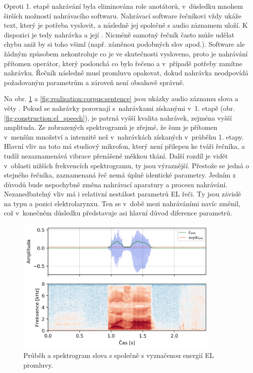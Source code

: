 Oproti 1. etapě nahrávání byla eliminována role anotátorů, v~důsledku mnohem širších možností nahrávacího softwaru.
Nahrávací software řečníkovi vždy ukáže text, který je potřeba vyslovit, a následně jej společně s audio záznamem uloží.
K dispozici je tedy nahrávka a její .
Nicméně samotný řečník často může udělat chybu aniž by si toho všiml (např. záměnou podobných slov apod.).
Software ale žádným způsobem nekontroluje co je ve skutečnosti vysloveno, proto je nahrávání přítomen operátor, který poslouchá co bylo řečeno a v~případě potřeby zamítne nahrávku.
Řečník následně musí promluvu opakovat, dokud nahrávka neodpovídá požadovaným parametrům a zároveň není obsahově správně.

Na obr. \ref{fig:realisation:corpus:word} a \ref{fig:realisation:corpus:sentence} jsou ukázky audio záznamu slova  a věty .
Pokud se nahrávky porovnají s~nahrávkami získanými v~1. etapě (obr. \ref{fig:construction:el_speech}), je patrná vyšší kvalita nahrávek, zejména vyšší amplituda.
Ze zobrazených spektrogramů je zřejmé, že šum je přítomen v~menším množství a intenzitě než v~nahrávkách získaných v~průběhu 1. etapy.
Hlavní vliv na toto má studiový mikrofon, který není přilepen ke tváři řečníka, a tudíž nezaznamenává vibrace přenášené měkkou tkání.
Další rozdíl je vidět v~oblasti nižších frekvencích spektrogramu, ty jsou výraznější.
Přestože se jedná o stejného řečníka, zaznamenaná řeč nemá úplně identické parametry.
Jedním z důvodů bude nepochybně změna nahrávací aparatury a procesu nahrávání.
Nezanedbatelný vliv má i relativní nestálost parametrů EL řeči.
Ty jsou závislé na typu a pozici elektrolarynxu.
Ten se v~době mezi nahráváními navíc změnil, což v~konečném důsledku představuje asi hlavní důvod diference parametrů.

\begin{figure}[hbpt]
  \centering
  \includegraphics[width=0.9\textwidth]{./ch5-construction/img/energy_spec_word.png}
  \caption[Průběh a spektrogram slova .]{Průběh a spektrogram slova  s společně s vyznačenou energií EL promluvy.}
  \label{fig:realisation:corpus:word}
\end{figure}

